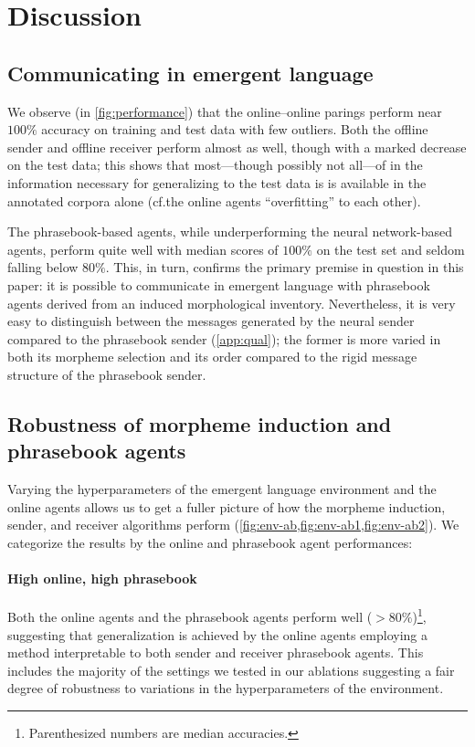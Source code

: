 \section{Discussion}%
\label{sec:pb-discussion}

\subsection{Communicating in emergent language}
We observe (in \cref{fig:performance}) that the online--online parings perform near $100\%$ accuracy on training and test data with few outliers.
Both the offline sender and offline receiver perform almost as well, though with a marked decrease on the test data; this shows that most---though possibly not all---of in the information necessary for generalizing to the test data is is available in the annotated corpora alone (cf.\@ the online agents ``overfitting'' to each other).

The phrasebook-based agents, while underperforming the neural network-based agents, perform quite well with median scores of $100\%$ on the test set and seldom falling below $80\%$.
This, in turn, confirms the primary premise in question in this paper: it is possible to communicate in emergent language with phrasebook agents derived from an induced morphological inventory.
Nevertheless, it is very easy to distinguish between the messages generated by the neural sender compared to the phrasebook sender (\cref{app:qual}); the former is more varied in both its morpheme selection and its order compared to the rigid message structure of the phrasebook sender.

\subsection{Robustness of morpheme induction and phrasebook agents}
Varying the hyperparameters of the emergent language environment and the online agents allows us to get a fuller picture of how the morpheme induction, sender, and receiver algorithms perform (\cref{fig:env-ab,fig:env-ab1,fig:env-ab2}).
We categorize the results by the online and phrasebook agent performances:

\paragraph{High online, high phrasebook}
Both the online agents and the phrasebook agents perform well (${>}80\%$)\footnote{Parenthesized numbers are median accuracies.}, suggesting that generalization is achieved by the online agents employing a method interpretable to both sender and receiver phrasebook agents.
This includes the majority of the settings we tested in our ablations suggesting a fair degree of robustness to variations in the hyperparameters of the environment.

